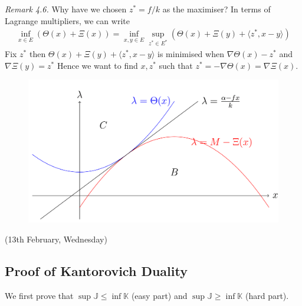 \documentclass[12pt,a4paper]{article}
\begin{document}
\emph{Remark 4.6.} Why have we chosen $z^* = f/k$ as the maximiser? In terms of Lagrange multipliers, we can write
\begin{align*}
\inf_{x\in E} (\Theta(x) + \Xi(x)) = \inf_{x, y\in E} \sup_{z^*\in E^*}(\Theta(x) + \Xi(y) + \langle z^*, x-y \rangle)
\end{align*}
Fix $z^*$  then $\Theta(x) + \Xi(y) + \langle z^*, x-y \rangle$ is minimised when $\nabla \Theta(x) - z^*$ and $\nabla \Xi(y) = z^*$ Hence we want to find $x, z^*$ such that $z^* = - \nabla \Theta(x) = \nabla \Xi(x)$.

\begin{figure}[h]
\begin{center}
    \includegraphics[scale=0.15]{5}
\end{center}
\end{figure}
\s

\newday

(13th February, Wednesday)

\subsection{Proof of Kantorovich Duality}

We first prove that  $\sup \mathbb{J} \leq \inf \mathbb{K}$ (easy part) and $\sup \mathbb{J} \geq \inf \mathbb{K}$ (hard part).
\s
\end{document}
